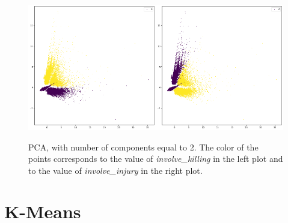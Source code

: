 \documentclass[10pt,a4paper]{report}
\begin{document}
\begin{figure}[h]
	\centering
	\includegraphics[width=0.5\textwidth]{pca_killing}\includegraphics[width=0.5\textwidth]{pca_injury}
	\caption{PCA, with number of components equal to 2.
	The color of the points corresponds to the value of \textit{involve\_killing} in the left plot and to the value of \textit{involve\_injury} in the right plot.}
	\label{pca}
\end{figure}

\section{K-Means}
\end{document}
